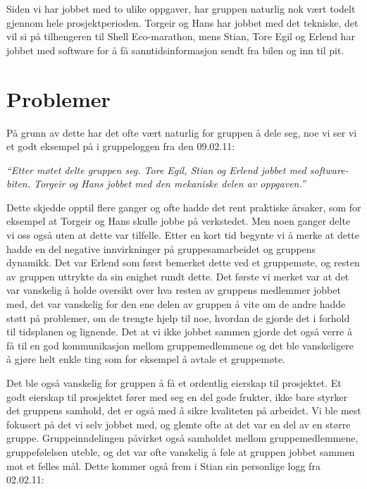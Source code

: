 Siden vi har jobbet med to ulike oppgaver, har gruppen naturlig nok vært todelt gjennom hele prosjektperioden. Torgeir og Hans har jobbet med det tekniske, det vil si på tilhengeren til Shell Eco-marathon, mens Stian, Tore Egil og Erlend har jobbet med software for å få sanntidsinformasjon sendt fra bilen og inn til pit.

\section{Problemer}
På grunn av dette har det ofte vært naturlig for gruppen å dele seg, noe vi ser vi et godt eksempel på i gruppeloggen fra den 09.02.11: \newline

\emph{``Etter møtet delte gruppen seg. Tore Egil, Stian og Erlend jobbet med software-biten. Torgeir
og Hans jobbet med den mekaniske delen av oppgaven.''}\newline

Dette skjedde opptil flere ganger og ofte hadde det rent praktiske årsaker, som for eksempel at Torgeir og Hans skulle jobbe på verkstedet. Men noen ganger delte vi oss også uten at dette var tilfelle. Etter en kort tid begynte vi å merke at dette hadde en del negative innvirkninger på gruppesamarbeidet og gruppens dynamikk. Det var Erlend som først bemerket dette ved et gruppemøte, og resten av gruppen uttrykte da sin enighet rundt dette.
Det første vi merket var at det var vanskelig å holde oversikt over hva resten av gruppens medlemmer jobbet med, det var vanskelig for den ene delen av gruppen å vite om de andre hadde støtt på problemer, om de trengte hjelp til noe, hvordan de gjorde det i forhold til tidsplanen og lignende. Det at vi ikke jobbet sammen gjorde det også verre å få til en god kommunikasjon mellom gruppemedlemmene og det ble vanskeligere å gjøre helt enkle ting som for eksempel å avtale et gruppemøte.

Det ble også vanskelig for gruppen å få et ordentlig eierskap til prosjektet. Et godt eierskap til prosjektet fører med seg en del gode frukter, ikke bare styrker det gruppens samhold, det er også med å sikre kvaliteten på arbeidet. Vi ble mest fokusert på det vi selv jobbet med, og glemte ofte at det var en del av en større gruppe. Gruppeinndelingen påvirket også samholdet mellom gruppemedlemmene, gruppefølelsen uteble, og det var ofte vanskelig å føle at gruppen jobbet sammen mot et felles mål. Dette kommer også frem i Stian sin personlige logg fra 02.02.11:\newline

